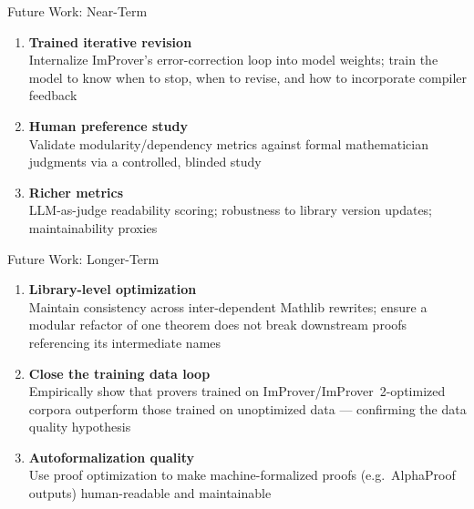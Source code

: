 \begin{frame}{Future Work: Near-Term}
\vspace{0.8em}
\begin{enumerate}\setlength{\itemsep}{12pt}
  \item \textbf{Trained iterative revision}\\
    \small Internalize ImProver's error-correction loop into model weights; train the model to know when to stop, when to revise, and how to incorporate compiler feedback
  \item \textbf{Human preference study}\\
    \small Validate modularity/dependency metrics against formal mathematician judgments via a controlled, blinded study
  \item \textbf{Richer metrics}\\
    \small LLM-as-judge readability scoring; robustness to library version updates; maintainability proxies
\end{enumerate}
\end{frame}

\begin{frame}{Future Work: Longer-Term}
\vspace{0.8em}
\begin{enumerate}\setlength{\itemsep}{12pt}
  \item \textbf{Library-level optimization}\\
    \small Maintain consistency across inter-dependent Mathlib rewrites; ensure a modular refactor of one theorem does not break downstream proofs referencing its intermediate names
  \item \textbf{Close the training data loop}\\
    \small Empirically show that provers trained on ImProver/ImProver~2-optimized corpora outperform those trained on unoptimized data --- confirming the data quality hypothesis
  \item \textbf{Autoformalization quality}\\
    \small Use proof optimization to make machine-formalized proofs (e.g.\ AlphaProof outputs) human-readable and maintainable
\end{enumerate}
\end{frame}

